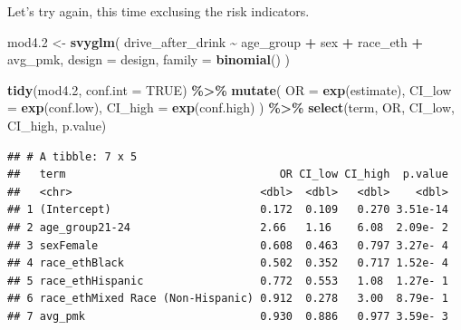 \documentclass[
]{article}
\newenvironment{Shaded}{\begin{snugshade}}{\end{snugshade}}
\newcommand{\AttributeTok}[1]{\textcolor[rgb]{0.13,0.29,0.53}{#1}}
\newcommand{\ConstantTok}[1]{\textcolor[rgb]{0.56,0.35,0.01}{#1}}
\newcommand{\FloatTok}[1]{\textcolor[rgb]{0.00,0.00,0.81}{#1}}
\newcommand{\FunctionTok}[1]{\textcolor[rgb]{0.13,0.29,0.53}{\textbf{#1}}}
\newcommand{\NormalTok}[1]{#1}
\newcommand{\OtherTok}[1]{\textcolor[rgb]{0.56,0.35,0.01}{#1}}
\newcommand{\SpecialCharTok}[1]{\textcolor[rgb]{0.81,0.36,0.00}{\textbf{#1}}}
\begin{document}
Let's try again, this time exclusing the risk indicators.

\begin{Shaded}
\begin{Highlighting}[]
\NormalTok{mod4}\FloatTok{.2} \OtherTok{\textless{}{-}} \FunctionTok{svyglm}\NormalTok{(}
\NormalTok{  drive\_after\_drink }\SpecialCharTok{\textasciitilde{}}\NormalTok{ age\_group }\SpecialCharTok{+}\NormalTok{ sex }\SpecialCharTok{+}\NormalTok{ race\_eth }\SpecialCharTok{+}\NormalTok{ avg\_pmk,}
  \AttributeTok{design =}\NormalTok{ design,}
  \AttributeTok{family =} \FunctionTok{binomial}\NormalTok{()}
\NormalTok{) }

\FunctionTok{tidy}\NormalTok{(mod4}\FloatTok{.2}\NormalTok{, }\AttributeTok{conf.int =} \ConstantTok{TRUE}\NormalTok{) }\SpecialCharTok{\%\textgreater{}\%}
  \FunctionTok{mutate}\NormalTok{(}
    \AttributeTok{OR =} \FunctionTok{exp}\NormalTok{(estimate),}
    \AttributeTok{CI\_low =} \FunctionTok{exp}\NormalTok{(conf.low),}
    \AttributeTok{CI\_high =} \FunctionTok{exp}\NormalTok{(conf.high)}
\NormalTok{  ) }\SpecialCharTok{\%\textgreater{}\%}
  \FunctionTok{select}\NormalTok{(term, OR, CI\_low, CI\_high, p.value) }
\end{Highlighting}
\end{Shaded}

\begin{verbatim}
## # A tibble: 7 x 5
##   term                                 OR CI_low CI_high  p.value
##   <chr>                             <dbl>  <dbl>   <dbl>    <dbl>
## 1 (Intercept)                       0.172  0.109   0.270 3.51e-14
## 2 age_group21-24                    2.66   1.16    6.08  2.09e- 2
## 3 sexFemale                         0.608  0.463   0.797 3.27e- 4
## 4 race_ethBlack                     0.502  0.352   0.717 1.52e- 4
## 5 race_ethHispanic                  0.772  0.553   1.08  1.27e- 1
## 6 race_ethMixed Race (Non-Hispanic) 0.912  0.278   3.00  8.79e- 1
## 7 avg_pmk                           0.930  0.886   0.977 3.59e- 3
\end{verbatim}
\end{document}
